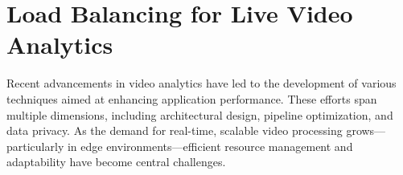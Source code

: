 



\section{Load Balancing for Live Video Analytics}

Recent advancements in video analytics have led to the development of various techniques aimed at enhancing application performance. These efforts span multiple dimensions, including architectural design, pipeline optimization, and data privacy. As the demand for real-time, scalable video processing grows—particularly in edge environments—efficient resource management and adaptability have become central challenges.

